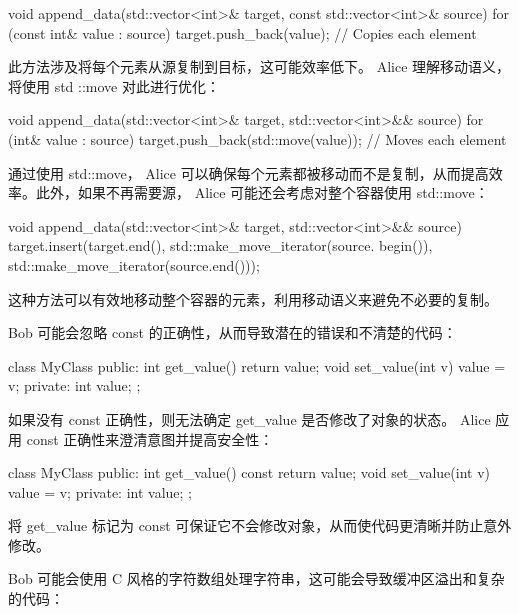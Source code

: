 \begin{cpp}
void append_data(std::vector<int>& target, const std::vector<int>&
source) {
    for (const int& value : source) {
        target.push_back(value); // Copies each element
    }
}
\end{cpp}

此方法涉及将每个元素从源复制到目标，这可能效率低下。 Alice 理解移动语义，将使用 std ::move 对此进行优化：

\begin{cpp}
void append_data(std::vector<int>& target, std::vector<int>&& source)
{
    for (int& value : source) {
        target.push_back(std::move(value)); // Moves each element
    }
}
\end{cpp}

通过使用 std::move， Alice 可以确保每个元素都被移动而不是复制，从而提高效率。此外，如果不再需要源， Alice 可能还会考虑对整个容器使用 std::move：

\begin{cpp}
void append_data(std::vector<int>& target, std::vector<int>&& source)
{
    target.insert(target.end(), std::make_move_iterator(source.
        begin()), std::make_move_iterator(source.end()));
}
\end{cpp}

这种方法可以有效地移动整个容器的元素，利用移动语义来避免不必要的复制。


Bob 可能会忽略 const 的正确性，从而导致潜在的错误和不清楚的代码：

\begin{cpp}
class MyClass {
public:
    int get_value() { return value; }
    void set_value(int v) { value = v; }
private:
    int value;
};
\end{cpp}

如果没有 const 正确性，则无法确定 get\_value 是否修改了对象的状态。 Alice 应用 const 正确性来澄清意图并提高安全性：

\begin{cpp}
class MyClass {
public:
    int get_value() const { return value; }
    void set_value(int v) { value = v; }
private:
    int value;
};
\end{cpp}

将 get\_value 标记为 const 可保证它不会修改对象，从而使代码更清晰并防止意外修改。


Bob 可能会使用 C 风格的字符数组处理字符串，这可能会导致缓冲区溢出和复杂的代码：

